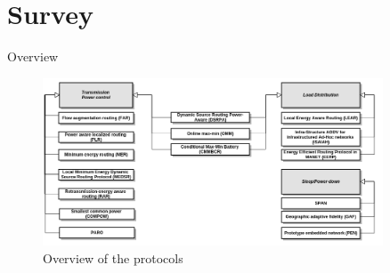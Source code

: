 \documentclass{beamer}
\begin{document}
\section{Survey}
\frame{\tableofcontents[currentsection]}
\begin{frame}{Overview}
\begin{figure}
  \centering
  \includegraphics[width=0.9\textwidth]{images/overview}
  \caption{Overview of the protocols}
  
\end{figure}
\end{frame}
\end{document}
